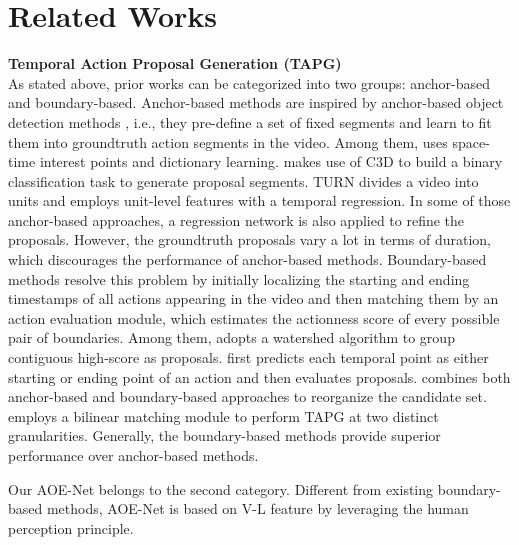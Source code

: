 \documentclass[sn-mathphys]{sn-jnl}
\theoremstyle{thmstyleone}\newtheorem{theorem}{Theorem}\newtheorem{proposition}[theorem]{Proposition}
\theoremstyle{thmstyletwo}\newtheorem{example}{Example}\newtheorem{remark}{Remark}
\theoremstyle{thmstylethree}\newtheorem{definition}{Definition}
\begin{document}
\section{Related Works}
\noindent
\textbf{Temporal Action Proposal Generation (TAPG)} \\
As stated above, prior works can be categorized into two groups: anchor-based and boundary-based. Anchor-based methods \cite{heilbron2016fast, FasterR_CNN_Action, anchor_1, anchor_2, anchor_3} are inspired by anchor-based object detection methods \cite{FasterRCNN, RetinaNet, yolov3}, i.e., they pre-define a set of fixed segments and learn to fit them into groundtruth action segments in the video. Among them, \cite{heilbron2016fast} uses space-time interest points and dictionary learning. \cite{anchor_2} makes use of C3D \cite{C3D_3} to build a binary classification task to generate proposal segments. TURN \cite{anchor_3} divides a video into units and employs unit-level features with a temporal regression. In some of those anchor-based approaches, a regression network is also applied to refine the proposals. However, the groundtruth proposals vary a lot in terms of duration, which discourages the performance of anchor-based methods. Boundary-based methods \cite{boundary_0, lin2018bsn, BSN++, liu2019multi, bmn, dbg, xu2020gtad, KhoaVo_ICASSP, KhoaVo_Access} resolve this problem by initially localizing the starting and ending timestamps of all actions appearing in the video and then matching them by an action evaluation module, which estimates the actionness score of every possible pair of boundaries. Among them, \cite{boundary_0} adopts a watershed algorithm to group contiguous high-score as proposals. \cite{lin2018bsn} first predicts each temporal point as either starting or ending point of an action and then evaluates proposals. \cite{CTAP} combines both anchor-based and boundary-based approaches to reorganize the candidate set. \cite{liu2019multi} employs a bilinear matching module to perform TAPG at two distinct granularities. Generally, the boundary-based methods provide superior performance over anchor-based methods.

Our AOE-Net belongs to the second category. Different from existing boundary-based methods, AOE-Net is based on V-L feature by leveraging the human perception principle.
\end{document}
